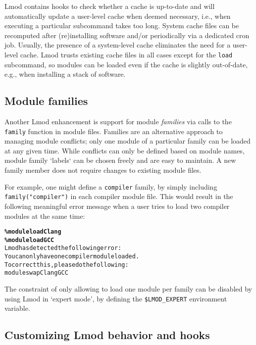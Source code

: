 Lmod contains hooks to check whether a cache is up-to-date and will automatically
update a user-level cache when deemed necessary, i.e., when executing a particular
subcommand takes too long. System cache files can be recomputed after (re)installing 
software and/or periodically via a dedicated cron job. Usually, the presence of a
system-level cache eliminates the need for a user-level cache. Lmod trusts existing
cache files in all cases except for the \texttt{\small load} subcommand, so
modules can be loaded even if the cache is slightly out-of-date,
e.g., when installing a stack of software.


\subsection{Module families}

Another Lmod enhancement is support for module
\emph{families} via calls to the \texttt{\small family} function in module files.
Families are an alternative approach to managing module conflicts; only one module of
a particular family can be loaded at any given time. While conflicts can only be
defined based on module names, module family `labels` can be chosen freely and
are easy to maintain. A new family member does not require changes to existing
module files.

For example, one might define a \texttt{\small compiler} family, by
simply including \texttt{\small family("compiler")} in each compiler module file.
This would result in the following meaningful error message when a user tries to
load two compiler modules at the same time:

{\small
\begin{alltt}
  \textbf{\% module load Clang}
  \textbf{\% module load GCC}
  Lmod has detected the following error:
  You can only have one compiler module loaded.
  To correct this, please do the following:
      module swap Clang GCC\
\end{alltt}}
\noindent
The constraint of only allowing to load one module per family can be
disabled by using Lmod in `expert mode', by defining the
\texttt{\small \$LMOD\_EXPERT} environment variable.

\subsection{Customizing Lmod behavior and hooks}

